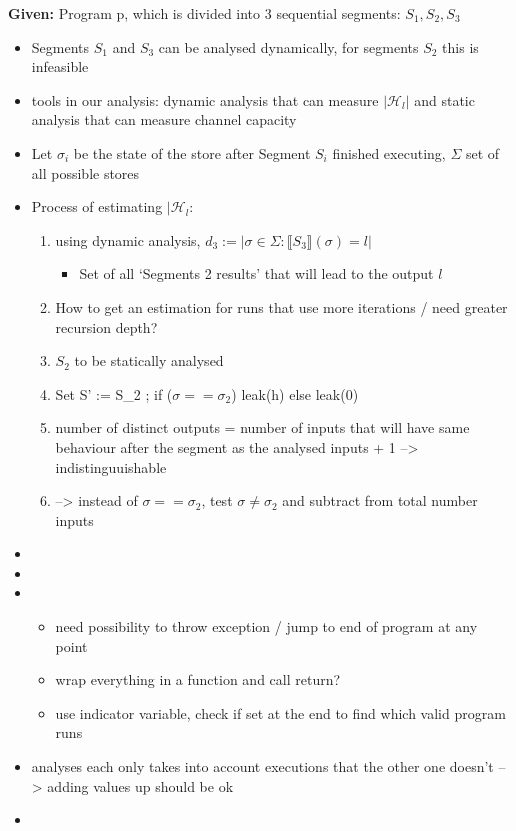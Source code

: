 \textbf{Given: } Program p, which is divided into 3 sequential segments: $S_1, S_2, S_3$
\begin{itemize}
    \item Segments $S_1$ and $S_3$ can be analysed dynamically, for segments $S_2$ this is infeasible
    \item tools in our analysis: dynamic analysis that can measure $|\mathcal{H}_l|$ and static analysis that can measure channel capacity
    \item Let $\sigma_i$ be the state of the store after Segment $S_i$ finished executing, $\Sigma$ set of all possible stores
    \item Process of estimating $|\mathcal{H}_l$:
    \begin{enumerate}
        \item using dynamic analysis, $d_3 := |{\sigma \in \Sigma: \llbracket S_3 \rrbracket (\sigma) = l}|$
        \begin{itemize}
            \item Set of all `Segments 2 results' that will lead to the output $l$
        \end{itemize}
        \item How to get an estimation for runs that use more iterations / need greater recursion depth?
        \item $S_2$ to be statically analysed
        \item Set S' := S_2 ; if ($\sigma == \sigma_2$) leak(h) else leak(0)
        \item number of distinct outputs = number of inputs that will have same behaviour after the segment as the analysed inputs + 1 --> indistinguuishable
        \item {} --> instead of $\sigma == \sigma_2$, test $\sigma \neq \sigma_2$ and subtract from total number inputs
    \end{enumerate}
    \item {}
            \item {}
            \item {}
            \begin{itemize}
                \item need possibility to throw exception / jump to end of program at any point
                \item wrap everything in a function and call return?
                \item use indicator variable, check if set at the end to find which valid program runs 
            \end{itemize}
            \item analyses each only takes into account executions that the other one doesn't --> adding values up should be ok
            \item 
\end{itemize}

